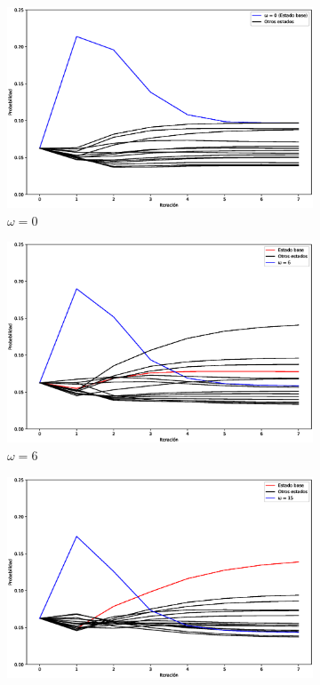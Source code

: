 \documentclass[xetex,mathserif,serif]{beamer}
\begin{document}
\begin{frame}
\begin{figure}[H]
    \centering
    \begin{subfigure}[m]{0.49\textwidth}
        \centering
        \includegraphics[width=0.99\linewidth]{img/grover0000loss.eps}
        \caption{$\omega = 0$}
        \label{fig:groverloss0000}
    \end{subfigure}
    \begin{subfigure}[m]{0.49\textwidth}
        \centering
        \includegraphics[width=0.99\linewidth]{img/grover0110loss.eps}
        \caption{$\omega = 6$}
        \label{fig:groverloss0110}
    \end{subfigure}
    \begin{subfigure}[m]{0.49\textwidth}
        \centering
        \includegraphics[width=0.99\linewidth]{img/groverallloss.eps}

\end{subfigure}
\end{figure}
\end{frame}
\end{document}
